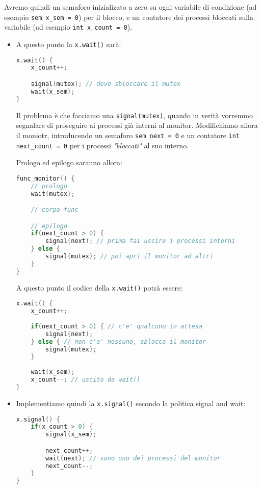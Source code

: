 \documentclass[a4paper,11pt]{article}
\begin{document}
Avremo quindi un semaforo inizializato a zero su ogni variabile di condizione (ad esempio \lstinline|sem x_sem = 0|) per il blocco, e un contatore dei processi bloccati sulla variabile (ad esempio \lstinline|int x_count = 0|).
\begin{itemize}
	\item A questo punto la \lstinline|x.wait()| sarà:
\begin{lstlisting}[language=C++, style=codestyle]	
x.wait() {
	x_count++;

	signal(mutex); // devo sbloccare il mutex 
	wait(x_sem);
}
\end{lstlisting}

Il problema è che facciamo una \lstinline|signal(mutex)|, quando in verità vorremmo segnalare di proseguire ai processi già interni al monitor.
Modifichiamo allora il moniotr, introducendo un semaforo \lstinline|sem next = 0| e un contatore \lstinline|int next_count = 0| per i processi \textit{"bloccati"} al suo interno.

Prologo ed epilogo saranno allora:
\begin{lstlisting}[language=C++, style=codestyle]	
func_monitor() {
	// prologo
	wait(mutex);

	// corpo func

	// epilogo
	if(next_count > 0) {
		signal(next); // prima fai uscire i processi interni
	} else {
		signal(mutex); // poi apri il monitor ad altri
	}
}
\end{lstlisting}


A questo punto il codice della \lstinline|x.wait()| potrà essere:
\begin{lstlisting}[language=C++, style=codestyle]	
x.wait() {
	x_count++;
	
	if(next_count > 0) { // c'e' qualcuno in attesa
		signal(next);
	} else { // non c'e' nessuno, sblocca il monitor
		signal(mutex);
	}
	
	wait(x_sem);
	x_count--; // uscito da wait()
}
\end{lstlisting}

	\item Implementiamo quindi la \lstinline|x.signal()| secondo la politica signal and wait:
\begin{lstlisting}[language=C++, style=codestyle]	
x.signal() {
	if(x_count > 0) {
		signal(x_sem);

		next_count++;
		wait(next); // sono uno dei processi del monitor
		next_count--;
	} 
}
\end{lstlisting}

\end{itemize}
\end{document}
